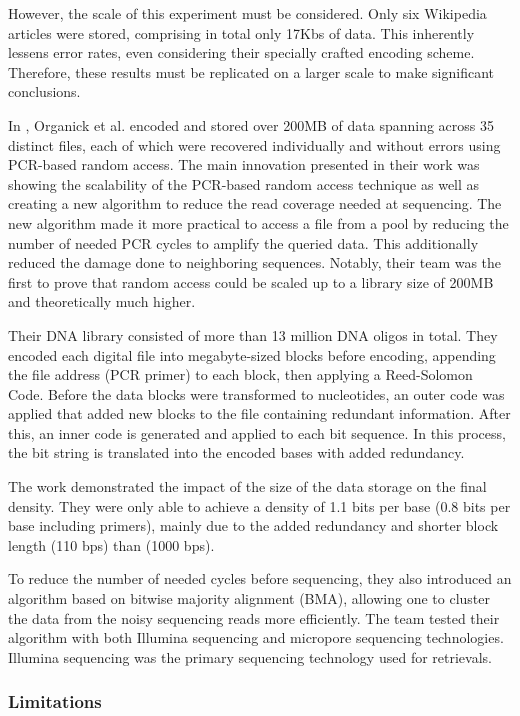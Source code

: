 \documentclass[a4paper,conference]{IEEEtran}
\begin{document}
However, the scale of this experiment must be considered. Only six Wikipedia articles were stored, comprising in total only 17Kbs of data. This inherently lessens error rates, even considering their specially crafted encoding scheme. Therefore, these results must be replicated on a larger scale to make significant conclusions. 

In \cite{organick_random_2018}, Organick et al. encoded and stored over 200MB of data spanning across 35 distinct files, each of which were recovered individually and without errors using PCR-based random access. The main innovation presented in their work was showing the scalability of the PCR-based random access technique as well as creating a new algorithm to reduce the read coverage needed at sequencing. The new algorithm made it more practical to access a file from a pool by reducing the number of needed PCR cycles to amplify the queried data. This additionally reduced the damage done to neighboring sequences. Notably, their team was the first to prove that random access could be scaled up to a library size of 200MB and theoretically much higher.

Their DNA library consisted of more than 13 million DNA oligos in total. They encoded each digital file into megabyte-sized blocks before encoding, appending the file address (PCR primer) to each block, then applying a Reed-Solomon Code. Before the data blocks were transformed to nucleotides, an outer code was applied that added new blocks to the file containing redundant information. After this, an inner code is generated and applied to each bit sequence. In this process, the bit string is translated into the encoded bases with added redundancy.

The work demonstrated the impact of the size of the data storage on the final density. They were only able to achieve a density of 1.1 bits per base (0.8 bits per base including primers), mainly due to the added redundancy and shorter block length (110 bps) than \cite{yazdi_rewritable_2015} (1000 bps).

To reduce the number of needed cycles before sequencing, they also introduced an algorithm based on bitwise majority alignment (BMA), allowing one to cluster the data from the noisy sequencing reads more efficiently. The team tested their algorithm with both Illumina sequencing and micropore sequencing technologies. Illumina sequencing was the primary sequencing technology used for retrievals.

\subsubsection{Limitations}
\end{document}
